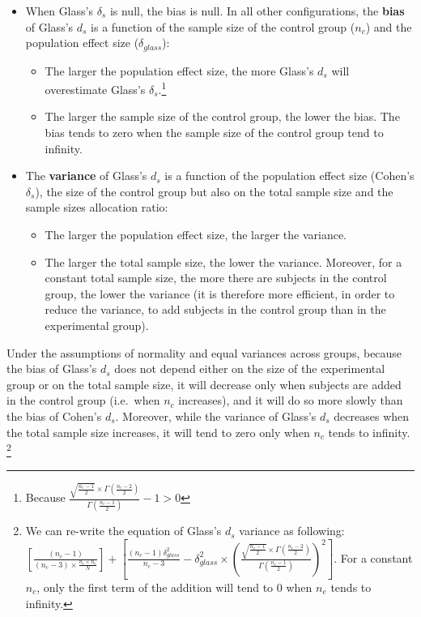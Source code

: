 \documentclass[
  man,floatsintext]{apa6}
\providecommand{\tightlist}{%
  \setlength{\itemsep}{0pt}\setlength{\parskip}{0pt}}
\begin{document}
\begin{itemize}
\item
  When Glass's \(\delta_s\) is null, the bias is null. In all other configurations, the \textbf{bias} of Glass's \(d_s\) is a function of the sample size of the control group (\(n_c\)) and the population effect size (\(\delta_{glass}\)):

  \begin{itemize}
  \tightlist
  \item
    The larger the population effect size, the more Glass's \(d_s\) will overestimate Glass's \(\delta_s\).\footnote{Because  $\frac{\sqrt{\frac{n_c-1}{2}} \times \Gamma(\frac{n_c-2}{2})}{\Gamma(\frac{n_c-1}{2})}-1 > 0$}\\
  \item
    The larger the sample size of the control group, the lower the bias. The bias tends to zero when the sample size of the control group tend to infinity.
  \end{itemize}
\item
  The \textbf{variance} of Glass's \(d_s\) is a function of the population effect size (Cohen's \(\delta_s\)), the size of the control group but also on the total sample size and the sample sizes allocation ratio:

  \begin{itemize}
  \tightlist
  \item
    The larger the population effect size, the larger the variance.
  \item
    The larger the total sample size, the lower the variance. Moreover, for a constant total sample size, the more there are subjects in the control group, the lower the variance (it is therefore more efficient, in order to reduce the variance, to add subjects in the control group than in the experimental group).
  \end{itemize}
\end{itemize}

Under the assumptions of normality and equal variances across groups, because the bias of Glass's \(d_s\) does not depend either on the size of the experimental group or on the total sample size, it will decrease only when subjects are added in the control group (i.e.~when \(n_c\) increases), and it will do so more slowly than the bias of Cohen's \(d_s\). Moreover, while the variance of Glass's \(d_s\) decreases when the total sample size increases, it will tend to zero only when \(n_c\) tends to infinity. \footnote{We can re-write the equation of Glass's $d_s$ variance as following:
$\left[\frac{(n_c-1)}{(n_c-3) \times \frac{n_c \times n_e}{N}}\right]+\left[\frac{(n_c-1)\delta^2_{glass}}{n_c-3} - \delta^2_{glass} \times \left( \frac{\sqrt{\frac{n_c-1}{2}}\times \Gamma(\frac{n_c-2}{2})}{\Gamma(\frac{n_c-1}{2})}\right)^2\right]$. For a constant $n_c$, only the first term of the addition will tend to 0 when $n_e$ tends to infinity.}
\end{document}
